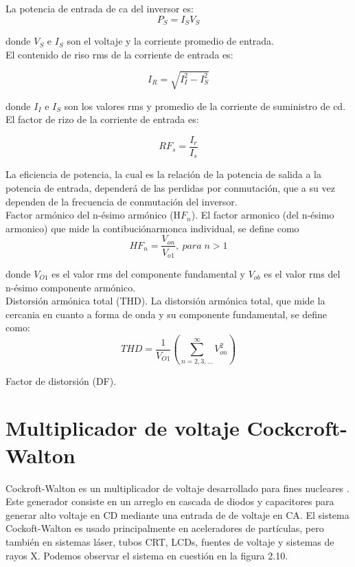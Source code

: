 La potencia de entrada de ca del inversor es:\\

\begin{equation}
P_{S}=I_{S}V_{S}
\end{equation}

donde $V_{S}$ e $I_{S}$ son el voltaje y la corriente promedio de entrada.\\

El contenido de riso rms de la corriente de entrada es:

\begin{equation}
I_{R}=\sqrt{I_{I}^{2}-I_{S}^{2}}
\end{equation}

donde $I_{I}$ e $I_{S}$ son los valores rms y promedio de la corriente de suministro de cd.
El factor de rizo de la corriente de entrada es: 

\begin{equation}
RF_{s}=\dfrac{I_{r}}{I_{s}}
\end{equation}

La eficiencia de potencia, la cual es la relación de la potencia de salida a la potencia de entrada, dependerá de las perdidas por conmutación, que a su vez dependen de la frecuencia de conmutación del inversor.\\

Factor armónico del n-ésimo armónico (H$F_{n}$). El factor armonico (del n-ésimo armonico) que mide la contibuciónarmonca individual, se define como \begin{equation}
HF_{n}=\dfrac{V_{on}}{V_{o1}}, \: para\; n>1
\end{equation}

donde $V_{O1}$ es el valor rms del componente fundamental y $V_{ob}$ es el valor rms del n-ésimo componente armónico.\\

Distorsión armónica total (THD). La distorsión armónica total, que mide la cercania en cuanto a forma de onda y su componente fundamental, se define como: \begin{equation}
THD=\dfrac{1}{V_{O1}}\left( \sum_{n=2,3,...}^{\infty }V_{on}^{2}\right)
\end{equation}

Factor de distorsión (DF).
 
\newpage
\section{Multiplicador de voltaje Cockcroft-Walton}
Cockroft-Walton es un multiplicador de voltaje desarrollado para fines nucleares \cite{CERN}. Este generador consiste en un arreglo en cascada de diodos y capacitores para generar alto voltaje en CD mediante una entrada de de voltaje en CA. El sistema Cockoft-Walton es usado principalmente en aceleradores de partículas, pero también en sistemas láser, tubos CRT, LCDs, fuentes de voltaje y sistemas de rayos X. Podemos observar el sistema en cuestión en la figura 2.10.  

